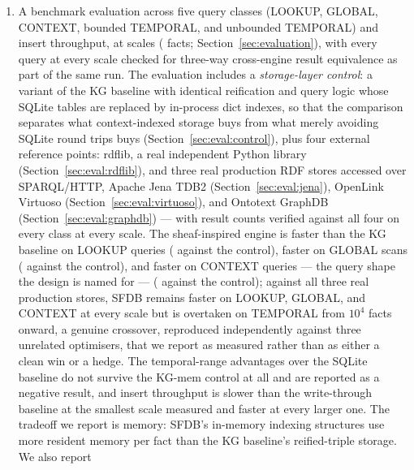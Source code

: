 \begin{enumerate}
    \item A benchmark evaluation across five query classes (LOOKUP,
          GLOBAL, CONTEXT, bounded TEMPORAL, and unbounded TEMPORAL) and insert
          throughput, at \benchscalecount{} scales
          (\benchscales{} facts; Section~\ref{sec:evaluation}), with
          every query at every scale checked for three-way cross-engine
          result equivalence as part of the same run. The evaluation
          includes a \emph{storage-layer control}: a variant of the KG
          baseline with identical reification and query logic whose
          SQLite tables are replaced by in-process dict indexes, so that
          the comparison separates what context-indexed storage buys
          from what merely avoiding SQLite round trips buys
          (Section~\ref{sec:eval:control}), plus four external reference
          points: rdflib, a real independent Python library
          (Section~\ref{sec:eval:rdflib}), and three real production RDF
          stores accessed over SPARQL/HTTP, Apache Jena TDB2
          (Section~\ref{sec:eval:jena}), OpenLink Virtuoso
          (Section~\ref{sec:eval:virtuoso}), and Ontotext GraphDB
          (Section~\ref{sec:eval:graphdb}) --- with result counts
          verified against all four on every class at every scale. The
          sheaf-inspired engine is
          \rangelookupkg{} faster than the KG baseline on LOOKUP queries
          (\rangelookupkgmem{} against the control),
          \rangeglobalkg{} faster on GLOBAL scans
          (\rangeglobalkgmem{} against the control), and
          \rangecontextkg{} faster on CONTEXT queries --- the query shape
          the design is named for --- (\rangecontextkgmem{} against the
          control); against all three real production stores, SFDB remains
          faster on LOOKUP, GLOBAL, and CONTEXT at every scale but is overtaken on
          TEMPORAL from $10^4$ facts onward, a genuine
          crossover, reproduced independently against three unrelated
          optimisers, that we report as measured rather than as either a
          clean win or a hedge. The temporal-range
          advantages over the SQLite baseline do not survive the KG-mem control at
          all and are reported as a negative result, and insert
          throughput is slower than the write-through baseline at the
          smallest scale measured and faster at every larger one.
          The tradeoff we report is memory: SFDB's in-memory indexing
          structures use \rangememkg{} more resident memory per fact
          than the KG baseline's reified-triple storage. We also report

\end{enumerate}
